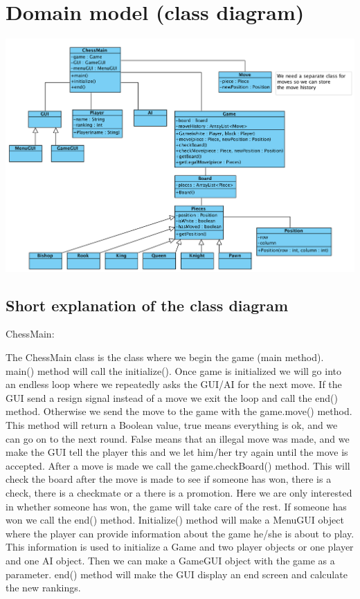 \documentclass{article}
\begin{document}
    \section{Domain model (class diagram)}
    \includegraphics[width=\linewidth]{image15.png}
    
    \subsection{Short explanation of the class diagram}
    
        ChessMain:\\
        \begin{outline}
            The ChessMain class is the class where we begin the game (main method).
            \1 main() method will call the initialize(). Once game is initialized we
            will go into an endless loop where we repeatedly asks the GUI/AI for the 
            next move. If the GUI send a resign signal instead of a move we exit the 
            loop and call the end() method. Otherwise we send the move to the game 
            with the game.move() method. This method will return a Boolean value, true means
            everything is ok, and we can go on to the next round. False means that an
            illegal move was made, and we make the GUI tell the player this
            and we let him/her try again until the move is accepted. After a move is made
            we call the game.checkBoard() method. This will check the board after the move
            is made to see if someone has won, there is a check, there is a checkmate or a
            there is a promotion. Here we are only interested in whether someone has won,
            the game will take care of the rest. If someone has won we call the end() method.
            \1 Initialize() method will make a MenuGUI object where the player can 
            provide information about the game he/she is about to play. This information
            is used to initialize a Game and two player objects or one player and one AI object.
            Then we can make a GameGUI object with the game as a parameter.
            \1 end() method will make the GUI display an end screen and calculate
            the new rankings.
        \end{outline}
        
\end{document}
